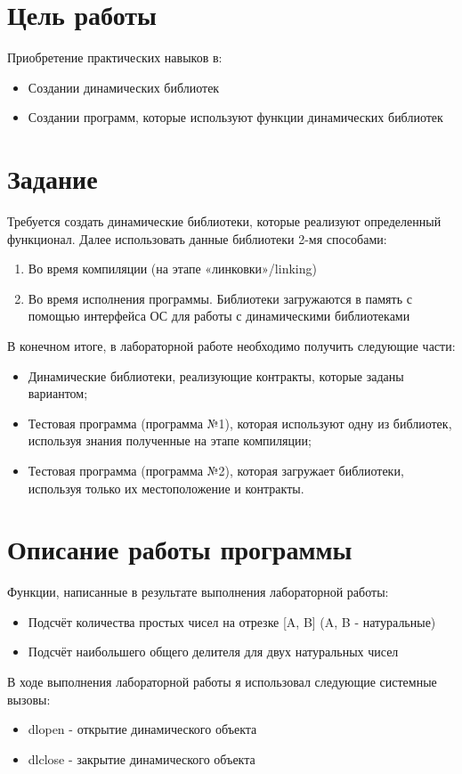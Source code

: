 \documentclass[a4paper, 12pt]{article}
\begin{document}
\section{Цель работы}
Приобретение практических навыков в:
\begin{itemize}
  \item Создании динамических библиотек
  \item Создании программ, которые используют функции динамических библиотек
\end{itemize}

\section{Задание}
Требуется создать динамические библиотеки, которые реализуют определенный функционал. Далее использовать данные библиотеки 2-мя способами:
\begin{enumerate}
  \item Во время компиляции (на этапе «линковки»/linking)
  \item Во время исполнения программы. Библиотеки загружаются в память с помощью интерфейса ОС для работы с динамическими библиотеками
\end{enumerate}
В конечном итоге, в лабораторной работе необходимо получить следующие части:
\begin{itemize}
  \item Динамические библиотеки, реализующие контракты, которые заданы вариантом;
  \item Тестовая программа (программа №1), которая используют одну из библиотек, используя знания полученные на этапе компиляции;
  \item Тестовая программа (программа №2), которая загружает библиотеки, используя только их местоположение и контракты.
\end{itemize}

\section{Описание работы программы}
Функции, написанные в результате выполнения лабораторной работы:
\begin{itemize}
  \item Подсчёт количества простых чисел на отрезке [A, B] (A, B - натуральные)
  \item Подсчёт наибольшего общего делителя для двух натуральных чисел
\end{itemize}

В ходе выполнения лабораторной работы я использовал следующие системные вызовы:
\begin{itemize}
  \item dlopen - открытие динамического объекта
  \item dlclose - закрытие динамического объекта
\end{itemize}
\end{document}
